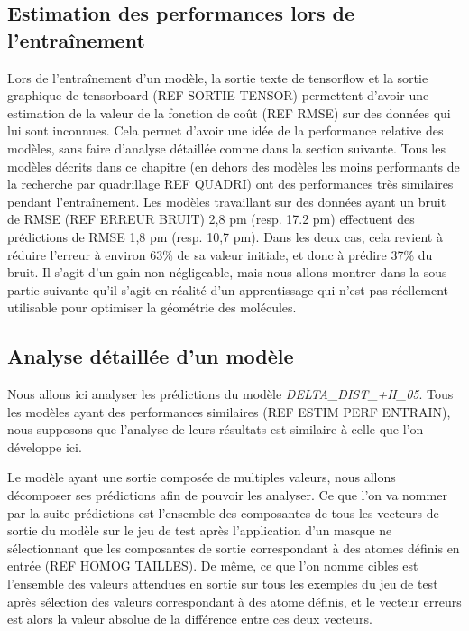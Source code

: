 \subsection{Estimation des performances lors de l'entraînement}

Lors de l'entraînement d'un modèle, la sortie texte de tensorflow et la sortie graphique de tensorboard (REF SORTIE TENSOR) permettent d'avoir une estimation de la valeur de la fonction de coût (REF RMSE) sur des données qui lui sont inconnues. Cela permet d'avoir une idée de la performance relative des modèles, sans faire d'analyse détaillée comme dans la section suivante. Tous les modèles décrits dans ce chapitre (en dehors des modèles les moins performants de la recherche par quadrillage REF QUADRI) ont des performances très similaires pendant l'entraînement. Les modèles travaillant sur des données ayant un bruit de RMSE (REF ERREUR BRUIT) 2,8 pm (resp. 17.2 pm) effectuent des prédictions de RMSE 1,8 pm (resp. 10,7 pm). Dans les deux cas, cela revient à réduire l'erreur à environ 63\% de sa valeur initiale, et donc à prédire 37\% du bruit. Il s'agit d'un gain non négligeable, mais nous allons montrer dans la sous-partie suivante qu'il s'agit en réalité d'un apprentissage qui n'est pas réellement utilisable pour optimiser la géométrie des molécules.

\subsection{Analyse détaillée d'un modèle}

\par Nous allons ici analyser les prédictions du modèle \emph{DELTA\_DIST\_+H\_05}. Tous les modèles ayant des performances similaires (REF ESTIM PERF ENTRAIN), nous supposons que l'analyse de leurs résultats est similaire à celle que l'on développe ici.

\par Le modèle ayant une sortie composée de multiples valeurs, nous allons décomposer ses prédictions afin de pouvoir les analyser. Ce que l'on va nommer par la suite prédictions est l'ensemble des composantes de tous les vecteurs de sortie du modèle sur le jeu de test après l'application d'un masque ne sélectionnant que les composantes de sortie correspondant à des atomes définis en entrée (REF HOMOG TAILLES). De même, ce que l'on nomme cibles est l'ensemble des valeurs attendues en sortie sur tous les exemples du jeu de test après sélection des valeurs correspondant à des atome définis, et le vecteur erreurs est alors la valeur absolue de la différence entre ces deux vecteurs.

